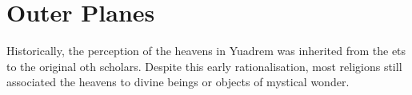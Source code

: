 
\section{Outer Planes}
Historically, the perception of the heavens in Yuadrem was inherited from the ets to the original oth scholars.
Despite this early rationalisation, most religions still associated the heavens to divine beings or objects of mystical wonder.




